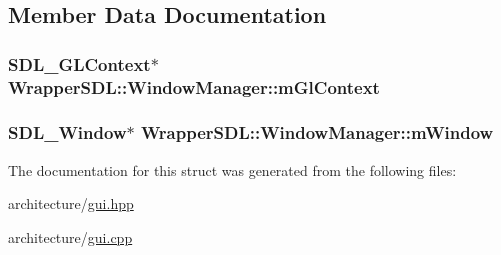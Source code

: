 \subsection{Member Data Documentation}
\subsubsection[{\texorpdfstring{m\+Gl\+Context}{mGlContext}}]{\setlength{\rightskip}{0pt plus 5cm}S\+D\+L\+\_\+\+G\+L\+Context$\ast$ Wrapper\+S\+D\+L\+::\+Window\+Manager\+::m\+Gl\+Context}\hypertarget{struct_wrapper_s_d_l_1_1_window_manager_a8257cbe95c6577a81fcfa83519f5e036}{}\label{struct_wrapper_s_d_l_1_1_window_manager_a8257cbe95c6577a81fcfa83519f5e036}
\subsubsection[{\texorpdfstring{m\+Window}{mWindow}}]{\setlength{\rightskip}{0pt plus 5cm}S\+D\+L\+\_\+\+Window$\ast$ Wrapper\+S\+D\+L\+::\+Window\+Manager\+::m\+Window}\hypertarget{struct_wrapper_s_d_l_1_1_window_manager_a38d24f995d5ed81c582edc825aeaf3c2}{}\label{struct_wrapper_s_d_l_1_1_window_manager_a38d24f995d5ed81c582edc825aeaf3c2}


The documentation for this struct was generated from the following files\+:\begin{DoxyCompactItemize}
\item 
architecture/\hyperlink{gui_8hpp}{gui.\+hpp}\item 
architecture/\hyperlink{gui_8cpp}{gui.\+cpp}\end{DoxyCompactItemize}
